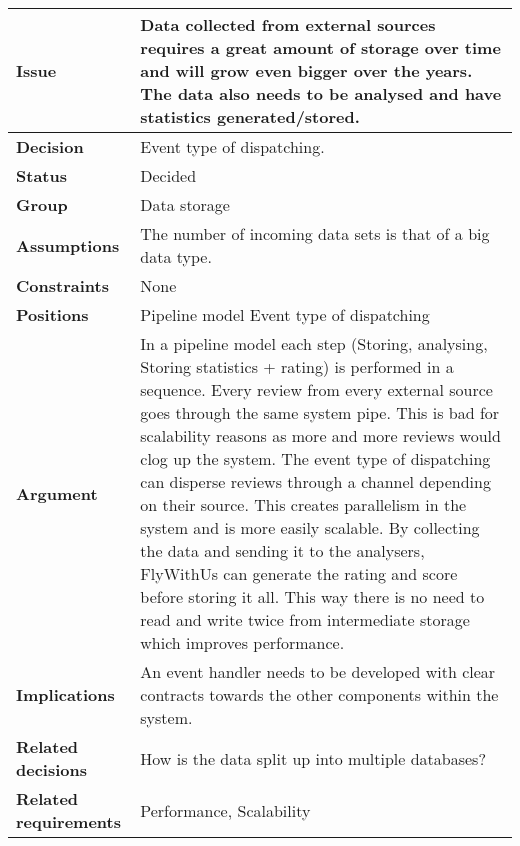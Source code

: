 
\label{dd:large-data}
\begin{tabular}{ l  p{10cm}}
\hline
\bf Issue & Data collected from external sources requires a great amount of storage over time and will grow even bigger over the years. The data also needs to be analysed and have statistics generated/stored. \\
\hline
\bf Decision & Event type of dispatching. \\
\hline
\bf Status & Decided \\
\hline
\bf Group & Data storage \\
\hline
\bf Assumptions & The number of incoming data sets is that of a big data type. \\
\hline
\bf Constraints & None \\
\hline
\bf Positions & Pipeline model \newline\newline
Event type of dispatching \\
\hline
\bf Argument & In a pipeline model each step (Storing, analysing, Storing statistics + rating) is performed in a sequence. Every review from every external source goes through the same system pipe. This is bad for scalability reasons as more and more reviews would clog up the system. The event type of dispatching can disperse reviews through a channel depending on their source. This creates parallelism in the system and is more easily scalable. By collecting the data and sending it to the analysers, FlyWithUs can generate the rating and score before storing it all. This way there is no need to read and write twice from intermediate storage which improves performance. \\
\hline
\bf Implications & An event handler needs to be developed with clear contracts towards the other components within the system. \\
\hline
\bf Related decisions & How is the data split up into multiple databases? \\
\hline
\bf Related requirements  & Performance, Scalability \\
\hline
\end{tabular}
